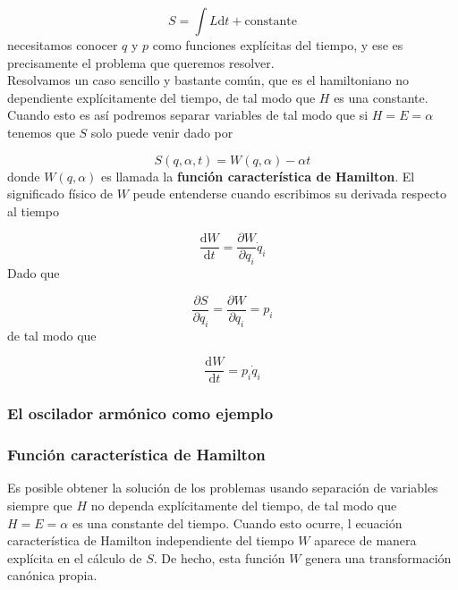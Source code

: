 \documentclass[12pt,a4paper]{article}
\numberwithin{equation}{section}
\numberwithin{figure}{section}
\newcommand{\parciales}[2]{\frac{\partial #1}{\partial #2}}
\newcommand{\D}{\mathrm{d}}
\newcommand{\derivadas}[2]{\frac{\D #1}{\D #2}}
\begin{document}
\begin{equation}
S = \int L \D t + \text{constante}
\end{equation}
necesitamos conocer $q$ y $p$ como funciones explícitas del tiempo, y ese es precisamente el problema que queremos resolver. \\

Resolvamos un caso sencillo y bastante común, que es el hamiltoniano no dependiente explícitamente del tiempo, de tal modo que $H$ es una constante. Cuando esto es así podremos separar variables de tal modo que si $H=E=\alpha$ tenemos que $S$ solo puede venir dado por

\begin{equation}
S ( q,\alpha,t) = W(q,\alpha) - \alpha t
\end{equation}
donde $W(q,\alpha)$ es llamada la \textbf{función característica de Hamilton}. El significado físico de $W$ peude entenderse cuando escribimos su derivada respecto al tiempo

\begin{equation}
\derivadas{W}{t} = \parciales{W}{q_i} \dot{q}_i
\end{equation}
Dado que 

\begin{equation}
\parciales{S}{q_i} = \parciales{W}{q_i} = p_i
\end{equation}
de tal modo que 

\begin{equation}
\derivadas{W}{t} = p_i \dot{q}_i
\end{equation}

\subsubsection{El oscilador armónico como ejemplo}


\subsubsection{Función característica de Hamilton}

Es posible obtener la solución de los problemas usando separación de variables siempre que $H$ no dependa explícitamente del tiempo, de tal modo que $H=E=\alpha$ es una constante del tiempo. Cuando esto ocurre, l ecuación característica de Hamilton independiente del tiempo $W$ aparece de manera explícita en el cálculo de $S$. De hecho, esta función $W$ genera una transformación canónica propia. \\
\end{document}
